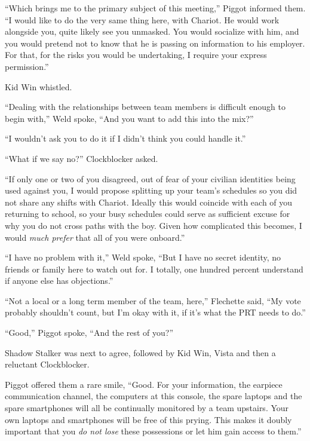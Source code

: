 ``Which brings me to the primary subject of this meeting,'' Piggot informed them.  ``I would like to do the very same thing here, with Chariot.  He would work alongside you, quite likely see you unmasked.  You would socialize with him, and you would pretend not to know that he is passing on information to his employer.  For that, for the risks you would be undertaking, I require your express permission.''



Kid Win whistled.



``Dealing with the relationships between team members is difficult enough to begin with,'' Weld spoke, ``And you want to add this into the mix?''



``I wouldn't ask you to do it if I didn't think you could handle it.''



``What if we say no?'' Clockblocker asked.



``If only one or two of you disagreed, out of fear of your civilian identities being used against you, I would propose splitting up your team's schedules so you did not share any shifts with Chariot.  Ideally this would coincide with each of you returning to school, so your busy schedules could serve as sufficient excuse for why you do not cross paths with the boy.  Given how complicated this becomes, I would \emph{much prefer} that all of you were onboard.''



``I have no problem with it,'' Weld spoke, ``But I have no secret identity, no friends or family here to watch out for.  I totally, one hundred percent understand if anyone else has objections.''



``Not a local or a long term member of the team, here,'' Flechette said, ``My vote probably shouldn't count, but I'm okay with it, if it's what the PRT needs to do.''



``Good,'' Piggot spoke, ``And the rest of you?''



Shadow Stalker was next to agree, followed by Kid Win, Vista and then a reluctant Clockblocker.



Piggot offered them a rare smile, ``Good.  For your information, the earpiece communication channel, the computers at this console, the spare laptops and the spare smartphones will all be continually monitored by a team upstairs.  Your own laptops and smartphones will be free of this prying.  This makes it doubly important that you \emph{do not lose} these possessions or let him gain access to them.''



